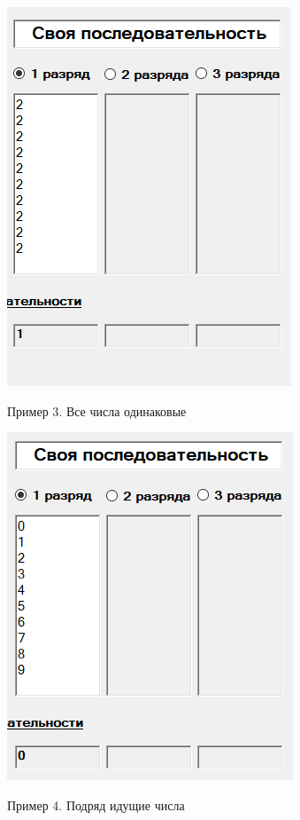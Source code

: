 \begin{figure}[h]
	\begin{center}
		{\includegraphics[scale = 0.55]{img/ex2.png}}
		\caption{Пример 3. Все числа одинаковые}
		\label{fig3:image}
	\end{center}
\end{figure}

\begin{figure}[h]
	\begin{center}
		{\includegraphics[scale = 0.55]{img/ex3.png}}
		\caption{Пример 4. Подряд идущие числа}
		\label{fig4:image}
	\end{center}
\end{figure}

